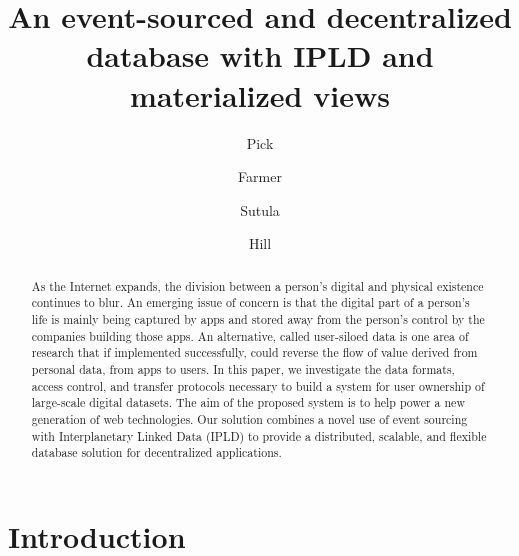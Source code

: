\documentclass{textile}
\begin{document}
\pagecolor{white}

\title[An event-sourced and decentralized database with IPLD and materialized views]{An event-sourced and decentralized database with IPLD and materialized views}
\author{Pick}
\author{Farmer}
\author{Sutula}
\author{Hill}
 






\begin{abstract}
As the Internet expands, the division between a person's digital and physical existence continues to blur. An emerging issue of concern is that the digital part of a person's life is mainly being captured by apps and stored away from the person's control by the companies building those apps. An alternative, called user-siloed data is one area of research that if implemented successfully, could reverse the flow of value derived from personal data, from apps to users. In this paper, we investigate the data formats, access control, and transfer protocols necessary to build a system for user ownership of large-scale digital datasets. The aim of the proposed system is to help power a new generation of web technologies. Our solution combines a novel use of event sourcing with Interplanetary Linked Data (IPLD) to provide a distributed, scalable, and flexible database solution for decentralized applications.
\end{abstract}

\maketitle


\section{Introduction}
\end{document}
